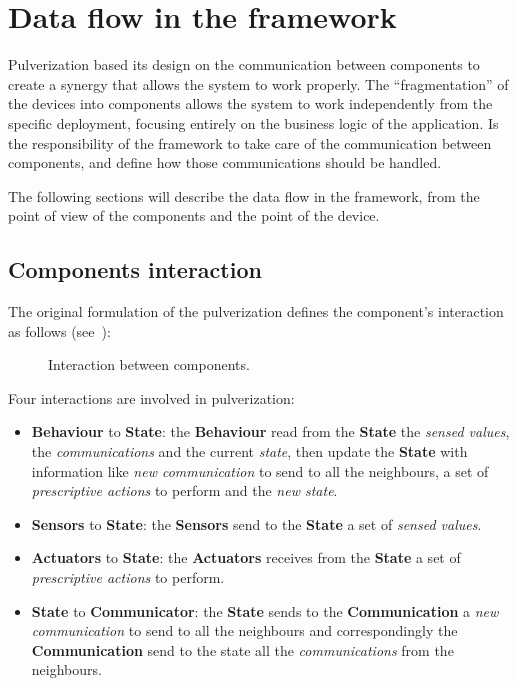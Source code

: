 
\section{Data flow in the framework}
\label{sec:framework-data-flow}

Pulverization based its design on the communication between components to create a synergy that allows the system to work properly.
The ``fragmentation'' of the devices into components allows the system to work independently from the specific deployment, focusing entirely on
the business logic of the application.
Is the responsibility of the framework to take care of the communication between components, and define how those communications should be handled.

The following sections will describe the data flow in the framework, from the point of view of the components and the point of the device.

\subsection{Components interaction}
\label{sec:framework-components-interaction}

The original formulation of the pulverization defines the component's interaction as follows (see~):

\begin{figure}
	\centering
	\caption{Interaction between components.}
	\label{fig:framework-components-interaction}
\end{figure}

Four interactions are involved in pulverization:
\begin{itemize}
	\item \textbf{Behaviour} to \textbf{State}: the \textbf{Behaviour} read from the \textbf{State} the \textit{sensed values}, the \textit
	      {communications} and the current \textit{state}, then update the \textbf{State} with information like \textit{new communication} to send to
	      all the neighbours, a set of \textit{prescriptive actions} to perform and the \textit{new state}.
	\item \textbf{Sensors} to \textbf{State}: the \textbf{Sensors} send to the \textbf{State} a set of \textit{sensed values}.
	\item \textbf{Actuators} to \textbf{State}: the \textbf{Actuators} receives from the \textbf{State} a set of \textit{prescriptive actions} to
	      perform.
	\item \textbf{State} to \textbf{Communicator}: the \textbf{State} sends to the \textbf{Communication} a \textit{new communication}
	      to send to all the neighbours and correspondingly the \textbf{Communication} send to the state all the \textit{communications} from the
	      neighbours.
\end{itemize}

